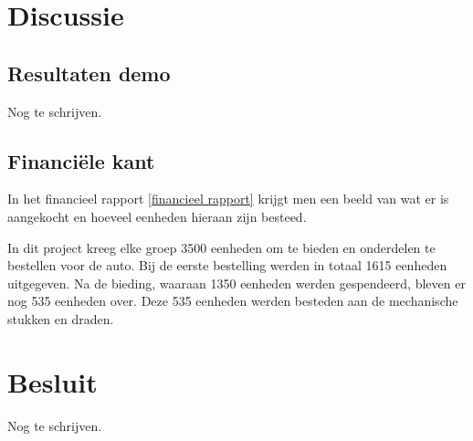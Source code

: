 \documentclass[a4paper,twoside,kulak]{kulakreport} %
\begin{document}
\section{Discussie} %
\subsection{Resultaten demo} 
Nog te schrijven. 

\subsection{Financiële kant} 
In het financieel rapport \ref{financieel rapport} krijgt men een beeld van wat er is aangekocht en hoeveel eenheden hieraan zijn besteed.  

In dit project kreeg elke groep 3500 eenheden om te bieden en onderdelen te bestellen voor de auto. Bij de eerste bestelling werden in totaal 1615 eenheden uitgegeven. Na de bieding, waaraan 1350 eenheden werden gespendeerd, bleven er nog 535 eenheden over. Deze 535 eenheden werden besteden aan de mechanische stukken en draden. 



\section{Besluit}
Nog te schrijven.



\newpage

\appendix
\label{financieel rapport}
\label{TechTekChassis}
\label{TechTekWiel}
\label{TechTekMotor}
\label{TechTekMicrocontroller}
\label{TechTekReflectiesensor}
\label{TechTekAfstandssensor}
\label{TechTekKleurensensor}







\end{document}
